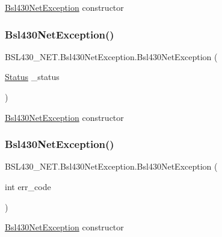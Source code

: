 \mbox{\hyperlink{class_b_s_l430___n_e_t_1_1_bsl430_net_exception}{Bsl430\+Net\+Exception}} constructor 

\mbox{\label{class_b_s_l430___n_e_t_1_1_bsl430_net_exception_aa6866836ebcd036734e7a039155dbb94}} 
\subsubsection{\texorpdfstring{Bsl430NetException()}{Bsl430NetException()}\hspace{0.1cm}{\footnotesize\ttfamily [2/5]}}
{\footnotesize\ttfamily B\+S\+L430\+\_\+\+N\+E\+T.\+Bsl430\+Net\+Exception.\+Bsl430\+Net\+Exception (\begin{DoxyParamCaption}\item[{\mbox{\hyperlink{class_b_s_l430___n_e_t_1_1_status}{Status}}}]{\+\_\+status }\end{DoxyParamCaption})}



\mbox{\hyperlink{class_b_s_l430___n_e_t_1_1_bsl430_net_exception}{Bsl430\+Net\+Exception}} constructor 

\mbox{\label{class_b_s_l430___n_e_t_1_1_bsl430_net_exception_a011e83246de12e6056763597b4d0acfd}} 
\subsubsection{\texorpdfstring{Bsl430NetException()}{Bsl430NetException()}\hspace{0.1cm}{\footnotesize\ttfamily [3/5]}}
{\footnotesize\ttfamily B\+S\+L430\+\_\+\+N\+E\+T.\+Bsl430\+Net\+Exception.\+Bsl430\+Net\+Exception (\begin{DoxyParamCaption}\item[{int}]{err\+\_\+code }\end{DoxyParamCaption})}



\mbox{\hyperlink{class_b_s_l430___n_e_t_1_1_bsl430_net_exception}{Bsl430\+Net\+Exception}} constructor 

